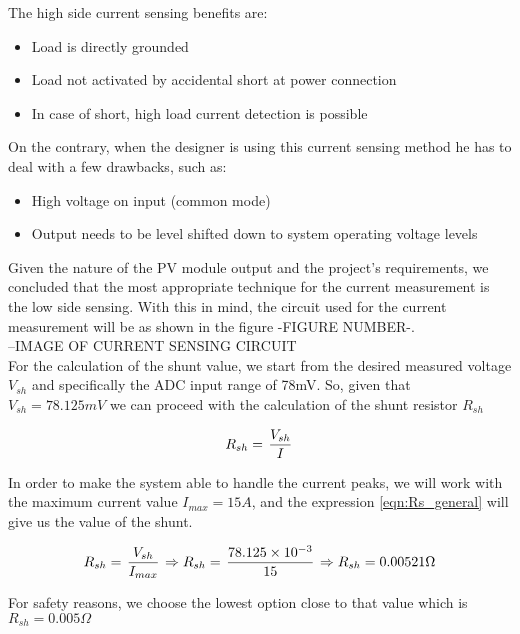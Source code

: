 The high side current sensing benefits are:

\begin{itemize}
    \item Load is directly grounded
    \item Load not activated by accidental short at power connection
    \item In case of short, high load current detection is possible
\end{itemize}

On the contrary, when the designer is using this current sensing method he has to deal with a few drawbacks, such as:

\begin{itemize}
    \item High voltage on input (common mode)
    \item Output needs to be level shifted down to system operating voltage levels
\end{itemize}

Given the nature of the PV module output and the project's requirements, we concluded that the most appropriate technique for the current measurement is the low side sensing. With this in mind, the circuit used for the current measurement will be as shown in the figure -FIGURE NUMBER-.\\

--IMAGE OF CURRENT SENSING CIRCUIT\\

For the calculation of the shunt value, we start from the desired measured voltage $V_{sh}$ and specifically the ADC input range of 78mV. So, given that $V_{sh} = 78.125mV$ we can proceed with the calculation of the shunt resistor $R_{sh}$

\begin{equation}
R_{sh} = \left. V_{sh} \over I \right.
\label{eqn:Rs_general}
\end{equation}

In order to make the system able to handle the current peaks, we will work with the maximum current value $I_{max}=15A$, and the expression \ref{eqn:Rs_general} will give us the value of the shunt.

\begin{equation}
R_{sh} = \left. V_{sh} \over I_{max} \right. \Rightarrow R_{sh} = \left. 78.125 \times 10^{-3} \over 15 \right. \Rightarrow R_{sh} = 0.00521\Omega
\label{eqn:Rs_calculation}
\end{equation}

For safety reasons, we choose the lowest option close to that value which is $R_{sh} = 0.005\Omega$

